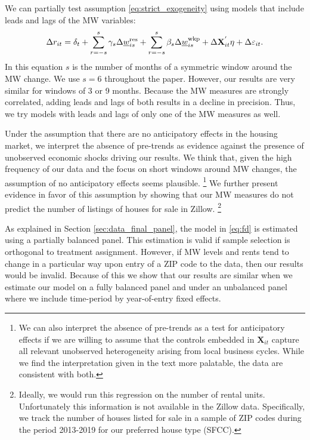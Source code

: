 We can partially test assumption \eqref{eq:strict_exogeneity} using models that 
include leads and lags of the MW variables:
\begin{equation} \label{eq:fd_leads_lags}
    \Delta r_{it} = \delta_t
                  + \sum_{r=-s}^{s} \gamma_s \Delta \underline{w}^{\text{res}}_{is} 
                  + \sum_{r=-s}^{s} \beta_s \Delta \underline{w}^{\text{wkp}}_{is}
                  + \Delta \mathbf{X}^{'}_{it}\eta
                  + \Delta \varepsilon_{it} .
\end{equation}
In this equation $s$ is the number of months of a symmetric window around the 
MW change.
We use $s=6$ throughout the paper. However, our results are very similar for 
windows of 3 or 9 months.
Because the MW measures are strongly correlated, adding leads and lags of both 
results in a decline in precision.
Thus, we try models with leads and lags of only one of the MW measures as well.

Under the assumption that there are no anticipatory effects in the housing 
market, we interpret the absence of pre-trends as evidence against the presence 
of unobserved economic shocks driving our results.
We think that, given the high frequency of our data and the focus on short 
windows around MW changes, the assumption of no anticipatory effects seems 
plausible.%
\footnote{We can also interpret the absence of pre-trends as a test for 
anticipatory effects if we are willing to assume that the controls embedded in 
$\mathbf{X}_{it}$ capture all relevant unobserved heterogeneity arising from 
local business cycles.
While we find the interpretation given in the text more palatable, the data are 
consistent with both.}
We further present evidence in favor of this assumption by showing that our MW 
measures do not predict the number of listings of houses for sale in Zillow.%
\footnote{Ideally, we would run this regression on the number of rental units.
Unfortunately this information is not available in the Zillow data.
Specifically, we track the number of houses listed for sale in a sample of ZIP 
codes during the period 2013-2019 for our preferred house type (SFCC).}

As explained in Section \ref{sec:data_final_panel}, 
the model in \eqref{eq:fd} is estimated using a partially balanced panel.
This estimation is valid if sample selection is orthogonal to treatment 
assignment.
However, if MW levels and rents tend to change in a particular way upon entry 
of a ZIP code to the data, then our results would be invalid.
Because of this we show that our results are similar when we estimate our model
on a fully balanced panel and under an unbalanced panel where we include 
time-period by year-of-entry fixed effects.

